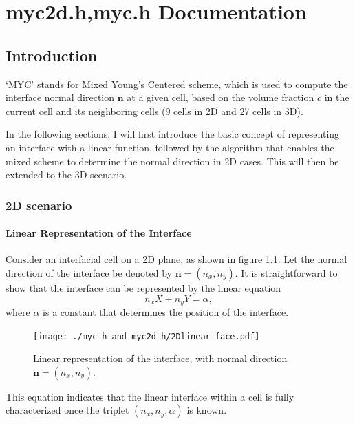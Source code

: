 \chapter{myc2d.h,myc.h Documentation}
\ifsingle
\maketitle
\fi
\chaptermeta[draft][2025-07-15]

\section{Introduction}
‘MYC’ stands for Mixed Young’s Centered scheme, which is used to compute the interface normal direction $\mathbf{n}$ at a given cell, based on the volume fraction $c$ in the current cell and its neighboring cells (9 cells in 2D and 27 cells in 3D).

In the following sections, I will first introduce the basic concept of representing an interface with a linear function, followed by the algorithm that enables the mixed scheme to determine the normal direction in 2D cases. This will then be extended to the 3D scenario.

\subsection{2D scenario}
\subsubsection{Linear Representation of the Interface}

Consider an interfacial cell on a 2D plane, as shown in figure \ref{fig:2Dlinear}. Let the normal direction of the interface be denoted by $\mathbf{n} = (n_x, n_y)$. It is straightforward to show that the interface can be represented by the linear equation
\begin{equation}
  n_x X + n_y Y = \alpha,
\end{equation}
where $\alpha$ is a constant that determines the position of the interface.

\begin{figure}[ht]
    \centering
    \texttt{[image: ./myc-h-and-myc2d-h/2Dlinear-face.pdf]}
    \caption{Linear representation of the interface, with normal direction $\mathbf{n} = (n_x, n_y)$.}
    \label{fig:2Dlinear}
\end{figure}

This equation indicates that the linear interface within a cell is fully characterized once the triplet $(n_x, n_y, \alpha)$ is known.

